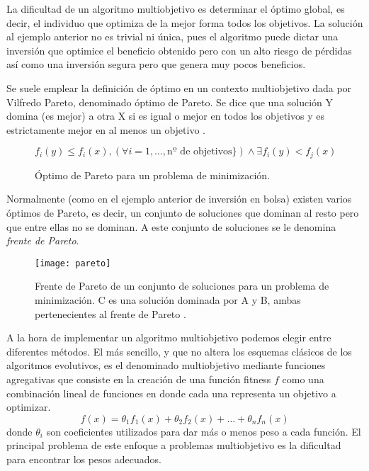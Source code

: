 La dificultad de un algoritmo multiobjetivo es determinar el óptimo global, es decir, el individuo que optimiza de la mejor forma todos los objetivos. La solución al ejemplo anterior no es trivial ni única, pues el algoritmo puede dictar una inversión que optimice el beneficio obtenido pero con un alto riesgo de pérdidas así como una inversión segura pero que genera muy pocos beneficios.

\blankline

Se suele emplear la definición de óptimo en un contexto multiobjetivo dada por Vilfredo Pareto, denominado óptimo de Pareto. Se dice que una solución Y domina (es mejor) a otra X si es igual o mejor en todos los objetivos y es estrictamente mejor en al menos un objetivo \cite{cervigon09}.
\begin{figure}[H]
\begin{equation*}
f_i(y) \leq f_i(x), (\forall i = 1, \dots, \textrm{nº de objetivos}\}) \wedge \exists f_i(y) < f_j(x)
\end{equation*}
\caption{Óptimo de Pareto para un problema de minimización.}
\end{figure}

Normalmente (como en el ejemplo anterior de inversión en bolsa) existen varios óptimos de Pareto, es decir, un conjunto de soluciones que dominan al resto pero que entre ellas no se dominan. A este conjunto de soluciones se le denomina \textit{frente de Pareto}.

\begin{figure}[H]
\centering
\texttt{[image: pareto]}
\caption{Frente de Pareto de un conjunto de soluciones para un problema de minimización. C es una solución dominada por A y B, ambas pertenecientes al frente de Pareto \cite{pictPareto}.}
\end{figure}

A la hora de implementar un algoritmo multiobjetivo podemos elegir entre diferentes  métodos. El más sencillo, y que no altera los esquemas clásicos de los algoritmos evolutivos, es el denominado multiobjetivo mediante funciones agregativas que consiste en la creación de una función fitness $f$ como una combinación lineal de funciones en donde cada una representa un objetivo a optimizar.
\begin{equation*}
f(x) = \theta_1f_1(x) + \theta_2f_2(x) + \dots + \theta_nf_n(x)
\end{equation*}
donde $\theta_i$ son coeficientes utilizados para dar más o menos peso a cada función. El principal problema de este enfoque a problemas multiobjetivo es la dificultad para encontrar los pesos adecuados.


